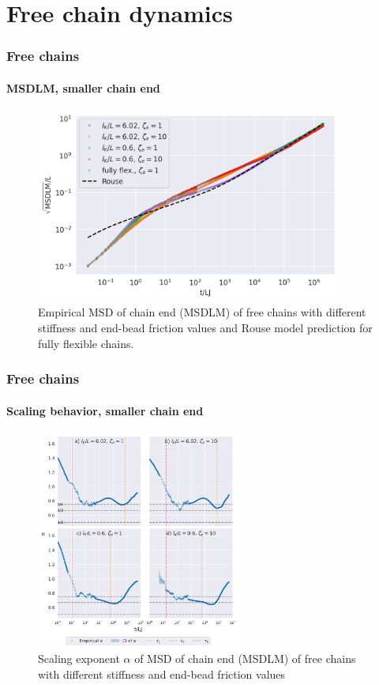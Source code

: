 \documentclass[handout]{beamer}
\begin{document}
\section{Free chain dynamics}


\begin{frame}
    \frametitle{Free chains}
    \framesubtitle{MSDLM, smaller chain end}
    \begin{figure}[h]
        \includegraphics[width=0.9\textwidth]{17+18+19+20-exp-msd-fm-log.png}
        \caption{
            Empirical MSD of chain end (MSDLM) of free chains
            with different stiffness and end-bead friction values and
            Rouse model prediction for fully flexible chains.
        }
    \end{figure}
\end{frame}


\begin{frame}
    \frametitle{Free chains}
    \framesubtitle{Scaling behavior, smaller chain end}
    \begin{figure}
        \centering
        \includegraphics[width=0.6\textwidth]{17+18+19+20-exp-alpha-fm.png}
        \caption{Scaling exponent $\alpha$ of MSD of chain end (MSDLM) 
        of free chains with different stiffness and end-bead friction values
        }
        \label{fig:alpha_fm_free}
    \end{figure}
\end{frame}
\end{document}

